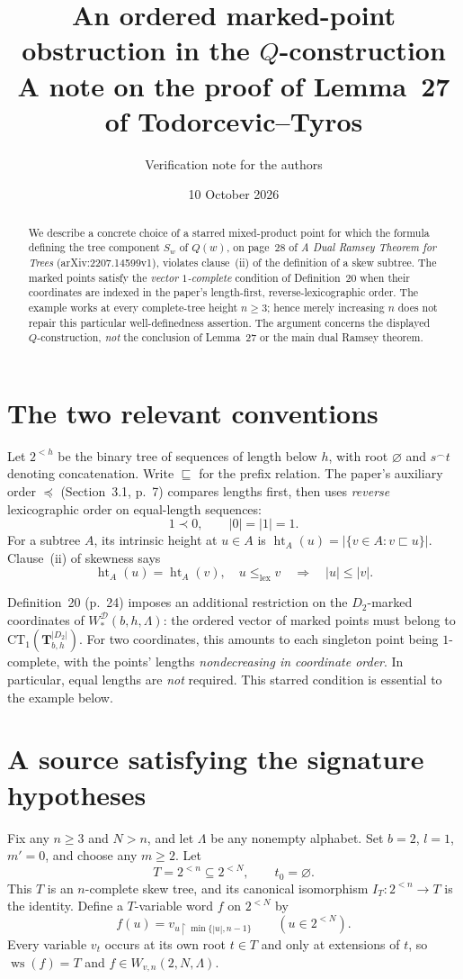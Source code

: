 \documentclass[11pt,a4paper]{article}
\title{An ordered marked-point obstruction in the $Q$-construction\\[3pt]
\large A note on the proof of Lemma~27 of Todorcevic--Tyros}
\author{Verification note for the authors}
\date{10 October 2026}
\newcommand{\eps}{\varnothing}
\newcommand{\lex}{\leq_{\mathrm{lex}}}
\newcommand{\initial}{\sqsubseteq}
\newcommand{\starred}{W^{\mathcal D}_*}
\newcommand{\lv}{\operatorname{ht}}
\newcommand{\ms}{\operatorname{ws}}
\newcommand{\sym}[1]{v_{#1}}
\begin{document}
\maketitle
\vspace{-1.5em}

\begin{abstract}
We describe a concrete choice of a starred mixed-product point for which the
formula defining the tree component $S_w$ of $Q(w)$, on page~28 of
\emph{A Dual Ramsey Theorem for Trees} (arXiv:2207.14599v1),
violates clause~(ii) of the definition of a skew subtree.
The marked points satisfy the \emph{vector $1$-complete} condition of
Definition~20 when their coordinates are indexed in the paper's
length-first, reverse-lexicographic order. The example works at every
complete-tree height $n\geq3$; hence merely increasing $n$ does not
repair this particular well-definedness assertion. The argument concerns
the displayed $Q$-construction, \emph{not} the conclusion of Lemma~27 or the
main dual Ramsey theorem.
\end{abstract}

\section*{The two relevant conventions}
Let $2^{<h}$ be the binary tree of sequences of length below $h$,
with root $\eps$ and $s\mathbin{^\frown}t$ denoting concatenation.
Write $\initial$ for the prefix relation. The paper's auxiliary order
$\preceq$ (Section~3.1, p.~7) compares lengths first, then uses
\emph{reverse} lexicographic order on equal-length sequences:
\[
  1\prec 0, \qquad |0|=|1|=1.
\]
For a subtree $A$, its intrinsic height at $u\in A$ is
$\lv_A(u)=|\{v\in A:v\sqsubset u\}|$. Clause~(ii) of skewness says
\begin{equation}\label{eq:skew}
  \lv_A(u)=\lv_A(v),\quad u\lex v
  \quad\Longrightarrow\quad |u|\leq |v|.
\end{equation}

Definition~20 (p.~24) imposes an additional restriction on the
$D_2$-marked coordinates of $\starred(b,h,\Lambda)$:
the ordered vector of marked points must belong to
$\mathrm{CT}_1(\mathbf T^{|D_2|}_{b,h})$.
For two coordinates, this amounts to each singleton point being
$1$-complete, with the points' lengths \emph{nondecreasing in
coordinate order}. In particular, equal lengths are \emph{not} required.
This starred condition is essential to the example below.

\section*{A source satisfying the signature hypotheses}
Fix any $n\geq3$ and $N>n$, and let $\Lambda$ be any nonempty
alphabet. Set $b=2$, $l=1$, $m'=0$, and choose any $m\geq2$.
Let
\[
 T=2^{<n}\subseteq 2^{<N}, \qquad t_0=\eps.
\]
This $T$ is an $n$-complete skew tree, and its canonical isomorphism
$I_T:2^{<n}\to T$ is the identity. Define a $T$-variable word $f$ on
$2^{<N}$ by
\[
  f(u)=\sym{u\upharpoonright\min\{|u|,n-1\}}
  \qquad (u\in 2^{<N}).
\]
Every variable $\sym t$ occurs at its own root $t\in T$ and only at
extensions of $t$, so $\ms(f)=T$ and $f\in W_{v,n}(2,N,\Lambda)$.
\end{document}

